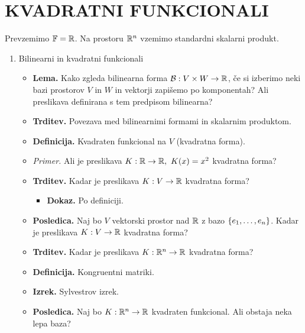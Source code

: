 \section{KVADRATNI FUNKCIONALI}
Prevzemimo $\mathbb{F} = \mathbb{R}$. Na prostoru $\mathbb{R}^n$ vzemimo standardni skalarni produkt.
\begin{enumerate}
    \item Bilinearni in kvadratni funkcionali
    \begin{itemize}
        \item \colorbox{blue!30}{\textbf{Lema.}} Kako zgleda bilinearna forma $\mathcal{B}: V \times W \to \mathbb{R}$, če si izberimo neki bazi prostorov $V$ in $W$ in vektorji zapišemo po komponentah? Ali preslikava definirana s tem predpisom bilinearna?
        \item \colorbox{blue!30}{\textbf{Trditev.}} Povezava med bilinearnimi formami in skalarnim produktom.
        \item \colorbox{purple!30}{\textbf{Definicija.}} Kvadraten funkcional na $V$ (kvadratna forma).
        \item \colorbox{yellow!30}{\emph{Primer.}} Ali je preslikava $K: \mathbb{R} \to \mathbb{R}, \ K(x) = x^2$ kvadratna forma?
        \item \colorbox{blue!30}{\textbf{Trditev.}} Kadar je preslikava $K: V \to \mathbb{R}$ kvadratna forma?
        \begin{itemize}
            \item \colorbox{green!30}{\textbf{Dokaz.}} Po definiciji.
        \end{itemize}
        \item \colorbox{orange!30}{\textbf{Posledica.}} Naj bo $V$ vektorski prostor nad $\mathbb{R}$ z bazo $\left\{e_1, \ldots, e_n\right\}$. Kadar je preslikava $K: V \to \mathbb{R}$ kvadratna forma?
        \item \colorbox{blue!30}{\textbf{Trditev.}} Kadar je preslikava $K: \mathbb{R}^n \to \mathbb{R}$ kvadratna forma?
        \item \colorbox{purple!30}{\textbf{Definicija.}} Kongruentni matriki.
        \item \colorbox{blue!30}{\textbf{Izrek.}} Sylvestrov izrek.
        \item \colorbox{orange!30}{\textbf{Posledica.}} Naj bo $K: \mathbb{R}^n \to \mathbb{R}$ kvadraten funkcional. Ali obstaja neka lepa baza?
    \end{itemize}


\end{enumerate}
